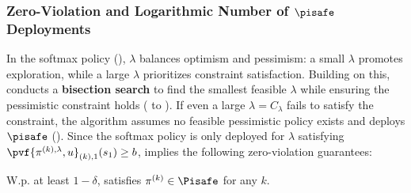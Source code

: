 \subsubsection{Zero-Violation and Logarithmic Number of $\pisafe$ Deployments}\label{subsec:MDP-zero-vio}

In the softmax policy (), $\lambda$ balances optimism and pessimism: a small $\lambda$ promotes exploration, while a large $\lambda$ prioritizes constraint satisfaction.
Building on this,  conducts a \textbf{bisection search} to find the smallest feasible $\lambda$ while ensuring the pessimistic constraint holds ( to ).
If even a large $\lambda = C_\lambda$ fails to satisfy the constraint, the algorithm assumes no feasible pessimistic policy exists and deploys $\pisafe$ ().
Since the softmax policy is only deployed for $\lambda$ satisfying $\pvf{\pi^{(k), \lambda}, u}_{(k), 1}(s_1) \geq b$,  implies the following zero-violation guarantees:
\begin{corollary}\label{corollary:zero-violation-MDP}
W.p. at least $1-\delta$,  satisfies $\pi^{(k)} \in \Pisafe$ for any $k$.
\end{corollary}



